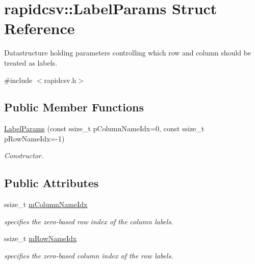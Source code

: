 \hypertarget{structrapidcsv_1_1LabelParams}{}\section{rapidcsv\+:\+:Label\+Params Struct Reference}
\label{structrapidcsv_1_1LabelParams}


Datastructure holding parameters controlling which row and column should be treated as labels.  




{\ttfamily \#include $<$rapidcsv.\+h$>$}

\subsection*{Public Member Functions}
\begin{DoxyCompactItemize}
\item 
\hyperlink{structrapidcsv_1_1LabelParams_a6064413b9cf2c075178a12c871830c6e}{Label\+Params} (const ssize\+\_\+t p\+Column\+Name\+Idx=0, const ssize\+\_\+t p\+Row\+Name\+Idx=-\/1)
\begin{DoxyCompactList}\small\item\em Constructor. \end{DoxyCompactList}\end{DoxyCompactItemize}
\subsection*{Public Attributes}
\begin{DoxyCompactItemize}
\item 
\mbox{\label{structrapidcsv_1_1LabelParams_aaf14cb2c1b71311303d301da36dd849b}} 
ssize\+\_\+t \hyperlink{structrapidcsv_1_1LabelParams_aaf14cb2c1b71311303d301da36dd849b}{m\+Column\+Name\+Idx}
\begin{DoxyCompactList}\small\item\em specifies the zero-\/based row index of the column labels. \end{DoxyCompactList}\item 
\mbox{\label{structrapidcsv_1_1LabelParams_a1a54ae242ac888b6c56e12c51e10f3a6}} 
ssize\+\_\+t \hyperlink{structrapidcsv_1_1LabelParams_a1a54ae242ac888b6c56e12c51e10f3a6}{m\+Row\+Name\+Idx}
\begin{DoxyCompactList}\small\item\em specifies the zero-\/based column index of the row labels. \end{DoxyCompactList}\end{DoxyCompactItemize}



